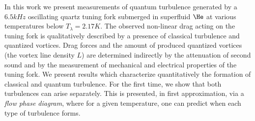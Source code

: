 In this work we present measurements of quantum turbulence generated by a $ 6.5\unit{kHz} $ oscillating quartz tuning fork submerged in superfluid $ \He $ at various temperatures below $ T_{\lambda} = 2.17\unit{K} $. The observed
non-linear drag acting on the tuning fork is qualitatively described by a presence of classical turbulence and quantized vortices. Drag forces and the amount of produced quantized vortices (the vortex line density $ L $) are determined indirectly by the attenuation of second sound and by the measurement of mechanical and electrical properties of the tuning fork.
We present results which characterize quantitatively the formation of classical and quantum turbulence. For the first time, we show that both turbulences can arise separately. This is presented, in first approximation, via a \textit{flow phase diagram}, where for a given temperature, one can predict when each type of turbulence forms.